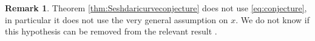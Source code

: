 \documentclass[12pt]{amsart}
\theoremstyle{definition}
\newtheorem{remark}[lemma]{Remark}
\renewcommand{\geq}{\geqslant}
\renewcommand{\leq}{\leqslant}
\newcommand{\inob}[2]{\ensuremath{{\Delta}_{#1}(#2)}}
\newcommand{\?}{ \circled{{\large\bf ?}}}
\begin{document}
\begin{remark}
Theorem \ref{thm:Seshdaricurveconjecture} does not use \eqref{eq:conjecture}, in particular it does not use the very general assumption on $x$. We do not know if this hypothesis can be removed from the relevant result \cite[Theorem 6.2.(3)]{FLgeneralities}.	
	

\end{remark}
  
	



	
\end{document}
